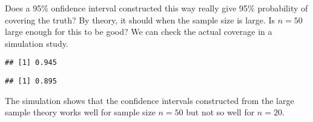 \begin{illustration}
Does a 95\% onfidence interval constructed this way really give 95\%
probability of covering the truth? By theory, it should when the
sample size is large. Is $n = 50$ large enough for this to be good?
We can check the actual coverage in a simulation study.
\begin{knitrout}
\color{fgcolor}\begin{kframe}
\begin{alltt}
 \hlkwb{<-} 
 \hlkwb{<-} \hlstd{(}\hlstd{,} \hlstd{,}  \hlstd{=} \hlstd{) \{}
     \hlkwb{<-}    \hlopt{/} \hlstd{,}  \hlstd{=} \hlstd{)}
\hlstd{\}}

 \hlkwb{<-}  
\hlstd{(sim[}\hlstd{, ]} \hlopt{<}  \hlopt{&} \hlstd{sim[}\hlstd{,]} \hlopt{>} 
\end{alltt}
\begin{verbatim}
## [1] 0.945
\end{verbatim}
\begin{alltt}
 \hlkwb{<-}  \hlstd{(}
\hlstd{(sim[}\hlstd{, ]} \hlopt{<}  \hlopt{&} \hlstd{sim[}\hlstd{,]} \hlopt{>} 
\end{alltt}
\begin{verbatim}
## [1] 0.895
\end{verbatim}
\end{kframe}
\end{knitrout}
The simulation shows that the confidence intervals constructed from
the large sample theory works well for sample size $n = 50$ but not so
well for $n = 20$.
\end{illustration}
